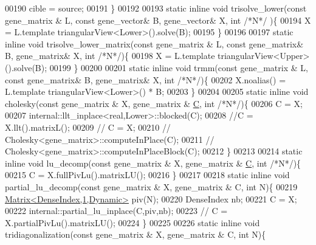 \begin{DoxyCode}
00190     cible = source;
00191   \}
00192 
00193   \textcolor{keyword}{static} \textcolor{keyword}{inline} \textcolor{keywordtype}{void} trisolve\_lower(\textcolor{keyword}{const} gene\_matrix & L, \textcolor{keyword}{const} gene\_vector& B, gene\_vector& X, \textcolor{keywordtype}{int}  \textcolor{comment}{/*N*/}
      )\{
00194     X = L.template triangularView<Lower>().solve(B);
00195   \}
00196 
00197   \textcolor{keyword}{static} \textcolor{keyword}{inline} \textcolor{keywordtype}{void} trisolve\_lower\_matrix(\textcolor{keyword}{const} gene\_matrix & L, \textcolor{keyword}{const} gene\_matrix& B, gene\_matrix& X, \textcolor{keywordtype}{int}
        \textcolor{comment}{/*N*/})\{
00198     X = L.template triangularView<Upper>().solve(B);
00199   \}
00200 
00201   \textcolor{keyword}{static} \textcolor{keyword}{inline} \textcolor{keywordtype}{void} trmm(\textcolor{keyword}{const} gene\_matrix & L, \textcolor{keyword}{const} gene\_matrix& B, gene\_matrix& X, \textcolor{keywordtype}{int}  \textcolor{comment}{/*N*/})\{
00202     X.noalias() = L.template triangularView<Lower>() * B;
00203   \}
00204 
00205   \textcolor{keyword}{static} \textcolor{keyword}{inline} \textcolor{keywordtype}{void} cholesky(\textcolor{keyword}{const} gene\_matrix & X, gene\_matrix & \hyperlink{group___core___module}{C}, \textcolor{keywordtype}{int}  \textcolor{comment}{/*N*/})\{
00206     C = X;
00207     internal::llt\_inplace<real,Lower>::blocked(C);
00208     \textcolor{comment}{//C = X.llt().matrixL();}
00209 \textcolor{comment}{//     C = X;}
00210 \textcolor{comment}{//     Cholesky<gene\_matrix>::computeInPlace(C);}
00211 \textcolor{comment}{//     Cholesky<gene\_matrix>::computeInPlaceBlock(C);}
00212   \}
00213 
00214   \textcolor{keyword}{static} \textcolor{keyword}{inline} \textcolor{keywordtype}{void} lu\_decomp(\textcolor{keyword}{const} gene\_matrix & X, gene\_matrix & \hyperlink{group___core___module}{C}, \textcolor{keywordtype}{int}  \textcolor{comment}{/*N*/})\{
00215     C = X.fullPivLu().matrixLU();
00216   \}
00217 
00218   \textcolor{keyword}{static} \textcolor{keyword}{inline} \textcolor{keywordtype}{void} partial\_lu\_decomp(\textcolor{keyword}{const} gene\_matrix & X, gene\_matrix & C, \textcolor{keywordtype}{int}  N)\{
00219     \hyperlink{group___core___module_class_eigen_1_1_matrix}{Matrix<DenseIndex,1,Dynamic>} piv(N);
00220     DenseIndex nb;
00221     C = X;
00222     internal::partial\_lu\_inplace(C,piv,nb);
00223 \textcolor{comment}{//     C = X.partialPivLu().matrixLU();}
00224   \}
00225 
00226   \textcolor{keyword}{static} \textcolor{keyword}{inline} \textcolor{keywordtype}{void} tridiagonalization(\textcolor{keyword}{const} gene\_matrix & X, gene\_matrix & C, \textcolor{keywordtype}{int}  N)\{

\end{DoxyCode}
